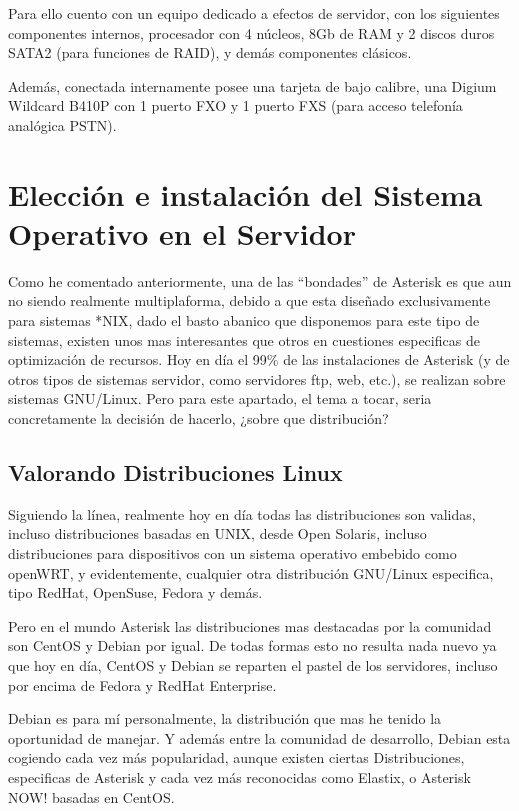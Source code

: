 Para ello cuento con un equipo dedicado a efectos de servidor, con los siguientes componentes internos, procesador con 4 núcleos, 8Gb de RAM y 2 discos duros SATA2 (para funciones de RAID), y demás componentes clásicos.

Además, conectada internamente posee una tarjeta de bajo calibre, una Digium Wildcard B410P con 1 puerto FXO y 1 puerto FXS (para acceso telefonía analógica PSTN).

\section{Elección e instalación del Sistema Operativo en el Servidor}

Como he comentado anteriormente, una de las “bondades” de Asterisk es que aun no siendo realmente multiplaforma, debido a que esta diseñado exclusivamente para sistemas *NIX, dado el basto abanico que disponemos para este tipo de sistemas, existen unos mas interesantes que otros en cuestiones especificas de optimización de recursos. Hoy en día el 99\% de las instalaciones de Asterisk (y de otros tipos de sistemas servidor, como servidores ftp, web, etc.), se realizan sobre sistemas GNU/Linux. Pero para este apartado, el tema a tocar, seria concretamente la decisión de hacerlo, ¿sobre que distribución?

\subsection{Valorando Distribuciones Linux}

Siguiendo la línea, realmente hoy en día todas las distribuciones son validas, incluso distribuciones basadas en UNIX, desde Open Solaris, incluso distribuciones para dispositivos con un sistema operativo embebido como openWRT, y evidentemente, cualquier otra distribución GNU/Linux especifica, tipo RedHat, OpenSuse, Fedora y demás.

Pero en el mundo Asterisk las distribuciones mas destacadas por la comunidad son CentOS y Debian por igual. De todas formas esto no resulta nada nuevo ya que hoy en día, CentOS y Debian se reparten el pastel de los servidores, incluso por encima de Fedora y RedHat Enterprise.

Debian es para mí personalmente, la distribución que mas he tenido la oportunidad de manejar. Y además entre la comunidad de desarrollo, Debian esta cogiendo cada vez más popularidad, aunque existen ciertas Distribuciones, especificas de Asterisk y cada vez más reconocidas como Elastix, o Asterisk NOW! basadas en CentOS. 

